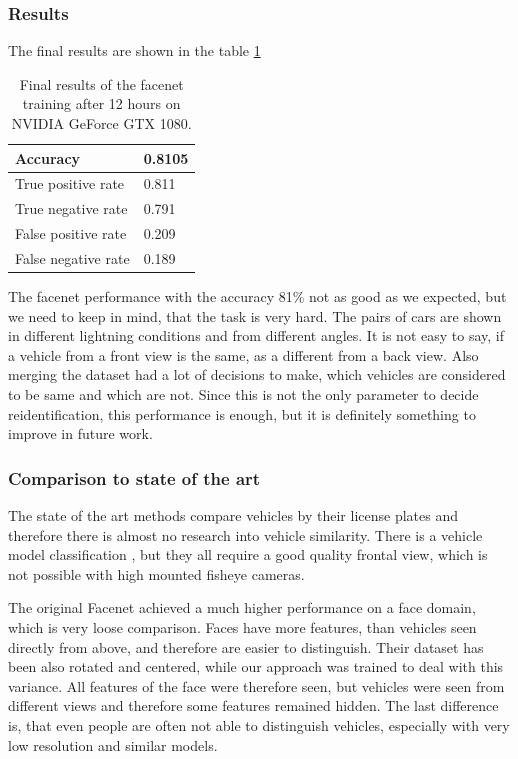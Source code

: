 \documentclass[a4paper,12pt,titlepage, twoside]{article}
\numberwithin{figure}{section}
\begin{document}
\subsubsection{Results}

The final results are shown in the table \ref{tab:facenet}


\begin{table}[H]
\centering
\begin{tabular}{|l|l|}
  \hline
  Accuracy & 0.8105 \\
  \hline
  True positive rate & 0.811 \\
  \hline
  True negative rate & 0.791 \\
  \hline
  False positive rate & 0.209 \\
  \hline
  False negative rate & 0.189 \\
  \hline
\end{tabular}
\caption{Final results of the facenet training after 12 hours on NVIDIA GeForce GTX 1080.}
\label{tab:facenet}
\end{table}

The facenet performance with the accuracy 81\% not as good as we expected, but we need to keep in mind, that the task is very hard. The pairs of cars are shown in different lightning conditions and from different angles. It is not easy to say, if a vehicle from a front view is the same, as a different from a back view. Also merging the dataset had a lot of decisions to make, which vehicles are considered to be same and which are not. Since this is not the only parameter to decide reidentification, this performance is enough, but it is definitely something to improve in future work.

\subsubsection{Comparison to state of the art}
The state of the art methods compare vehicles by their license plates and therefore there is almost no research into vehicle similarity. There is a vehicle model classification \cite{munroe2005multi, psyllos2011vehicle, lai2001vehicle}, but they all require a good quality frontal view, which is not possible with high mounted fisheye cameras.

The original Facenet achieved a much higher performance on a face domain, which is very loose comparison. Faces have more features, than vehicles seen directly from above, and therefore are easier to distinguish.  Their dataset has been also rotated and centered, while our approach was trained to deal with this variance. All features of the face were therefore seen, but vehicles were seen from different views and therefore some features remained hidden. The last difference is, that even people are often not able to distinguish vehicles, especially with very low resolution and similar models. 
\end{document}
